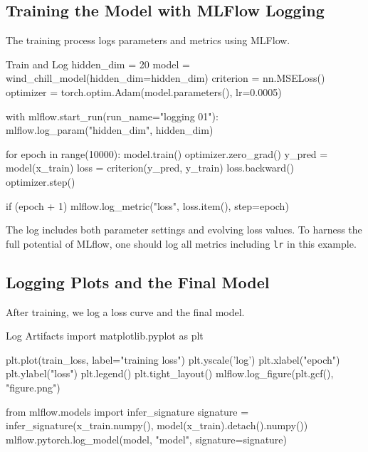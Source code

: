 %
\subsection{Training the Model with MLFlow Logging}

The training process logs parameters and metrics using MLFlow.

\begin{codeonly}{Train and Log}
hidden_dim = 20
model = wind_chill_model(hidden_dim=hidden_dim)
criterion = nn.MSELoss()
optimizer = torch.optim.Adam(model.parameters(), lr=0.0005)

with mlflow.start_run(run_name="logging 01"):
    mlflow.log_param("hidden_dim", hidden_dim)

    for epoch in range(10000):
        model.train()
        optimizer.zero_grad()
        y_pred = model(x_train)
        loss = criterion(y_pred, y_train)
        loss.backward()
        optimizer.step()

        if (epoch + 1) %
            mlflow.log_metric("loss", loss.item(), step=epoch)
\end{codeonly}

The log includes both parameter settings and evolving loss values.
To harness the full potential of MLflow, one should log all metrics including \texttt{lr} in this example.

%
\subsection{Logging Plots and the Final Model}

After training, we log a loss curve and the final model.

\begin{codeonly}{Log Artifacts}
import matplotlib.pyplot as plt

plt.plot(train_loss, label="training loss")
plt.yscale('log')
plt.xlabel("epoch")
plt.ylabel("loss")
plt.legend()
plt.tight_layout()
mlflow.log_figure(plt.gcf(), "figure.png")

from mlflow.models import infer_signature
signature = infer_signature(x_train.numpy(), model(x_train).detach().numpy())
mlflow.pytorch.log_model(model, "model", signature=signature)
\end{codeonly}

